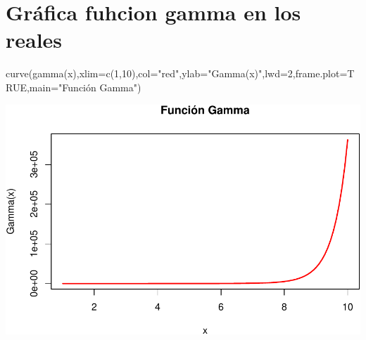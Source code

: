 \documentclass[
]{article}
\newenvironment{Shaded}{\begin{snugshade}}{\end{snugshade}}
\newcommand{\AttributeTok}[1]{\textcolor[rgb]{0.77,0.63,0.00}{#1}}
\newcommand{\ConstantTok}[1]{\textcolor[rgb]{0.00,0.00,0.00}{#1}}
\newcommand{\DecValTok}[1]{\textcolor[rgb]{0.00,0.00,0.81}{#1}}
\newcommand{\FunctionTok}[1]{\textcolor[rgb]{0.00,0.00,0.00}{#1}}
\newcommand{\NormalTok}[1]{#1}
\newcommand{\StringTok}[1]{\textcolor[rgb]{0.31,0.60,0.02}{#1}}
\begin{document}
\hypertarget{gruxe1fica-fuhcion-gamma-en-los-reales}{%
\section{Gráfica fuhcion gamma en los
reales}\label{gruxe1fica-fuhcion-gamma-en-los-reales}}

\begin{Shaded}
\begin{Highlighting}[]
\FunctionTok{curve}\NormalTok{(}\FunctionTok{gamma}\NormalTok{(x),}\AttributeTok{xlim=}\FunctionTok{c}\NormalTok{(}\DecValTok{1}\NormalTok{,}\DecValTok{10}\NormalTok{),}\AttributeTok{col=}\StringTok{"red"}\NormalTok{,}\AttributeTok{ylab=}\StringTok{"Gamma(x)"}\NormalTok{,}\AttributeTok{lwd=}\DecValTok{2}\NormalTok{,}\AttributeTok{frame.plot=}\ConstantTok{TRUE}\NormalTok{,}\AttributeTok{main=}\StringTok{"Función Gamma"}\NormalTok{)}
\end{Highlighting}
\end{Shaded}

\includegraphics{gamma_files/figure-latex/unnamed-chunk-1-1.pdf}
\end{document}
